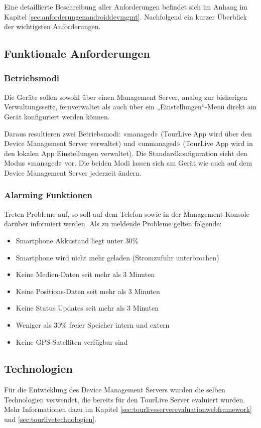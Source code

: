 Eine detaillierte Beschreibung aller Anforderungen befindet sich im Anhang im Kapitel \ref{sec:anforderungenandroiddevmgmt}. Nachfolgend ein kurzer Überblick der wichtigsten Anforderungen.

\subsection{Funktionale Anforderungen}
\subsubsection{Betriebsmodi}
Die Geräte sollen sowohl über einen Management Server, analog zur bisherigen Verwaltungsseite, fernverwaltet als auch über ein „Einstellungen“-Menü direkt am Gerät konfiguriert werden können. 

Daraus resultieren zwei Betriebsmodi: «managed» (TourLive App wird über den Device Management Server verwaltet) und «unmanaged» (TourLive App wird in den lokalen App Einstellungen verwaltet). Die Standardkonfiguration sieht den Modus «managed» vor. Die beiden Modi lassen sich am Gerät wie auch auf dem Device Management Server jederzeit ändern. 


\subsubsection{Alarming Funktionen}
Treten Probleme auf, so soll auf dem Telefon sowie in der Management Konsole darüber informiert werden. Als zu meldende Probleme gelten folgende:
\begin{itemize}
\item Smartphone Akkustand liegt unter 30\%
\item Smartphone wird nicht mehr geladen (Stromzufuhr unterbrochen)
\item Keine Medien-Daten seit mehr als 3 Minuten
\item Keine Positions-Daten seit mehr als 3 Minuten
\item Keine Status Updates seit mehr als 3 Minuten
\item Weniger als 30\% freier Speicher intern und extern
\item Keine GPS-Satelliten verfügbar sind
\end{itemize}
	
\subsection{Technologien}
Für die Entwicklung des Device Management Servers wurden die selben Technologien verwendet, die bereits für den TourLive Server evaluiert wurden. Mehr Informationen dazu im Kapitel \ref{sec:tourliveserverevaluationwebframework} und \ref{sec:tourlivetechnologien}.


